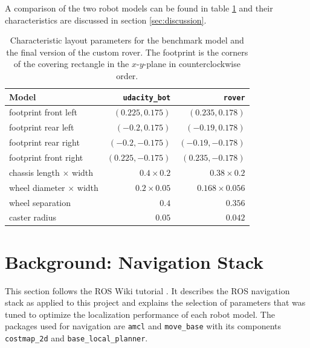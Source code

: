 \documentclass[10pt,journal,compsoc]{IEEEtran}
\begin{document}
A comparison of the two robot models can be found in table \ref{tab:robot_layout_comparison} and their characteristics are discussed in section \ref{sec:discussion}.
\begin{table}[thpb]
\caption{Characteristic layout parameters for the benchmark model and the final version of the custom rover. The footprint is the corners of the covering rectangle in the $x$-$y$-plane in counterclockwise order.}
\label{tab:robot_layout_comparison}
\begin{center}
\renewcommand{\arraystretch}{1.3}
\begin{tabular}{|l|r|r|}
\hline
Model & \texttt{udacity\_bot} & \texttt{rover} \\
\hline
footprint front left  & $\left(0.225, 0.175\right)$ & $\left(0.235,  0.178 \right)$ \\
footprint rear left   & $\left( -0.2, 0.175\right)$ & $\left(-0.19,  0.178 \right)$ \\
footprint rear right  & $\left( -0.2,-0.175\right)$ & $\left(-0.19, -0.178 \right)$ \\
footprint front right & $\left(0.225,-0.175\right)$ & $\left(0.235, -0.178 \right)$ \\
\hline
chassis length $\times$ width & $0.4 \times 0.2$ & $0.38 \times 0.2$ \\
wheel diameter $\times$ width & $0.2 \times 0.05$  & $0.168 \times 0.056$ \\
wheel separation  & $0.4$  & $0.356$ \\
caster radius & $0.05$ & $0.042$ \\
\hline
\end{tabular}
\end{center}
\end{table}

\section{Background: Navigation Stack}
\label{sec:background_navigation_stack}
This section follows the ROS Wiki tutorial \cite{ros_wiki_nav_stack}. It describes the ROS navigation stack as applied to this project and explains the selection of parameters that was tuned to optimize the localization performance of each robot model. The packages used for navigation are \texttt{amcl} and \texttt{move\_base} with its components \texttt{costmap\_2d} and \texttt{base\_local\_planner}.
\end{document}
